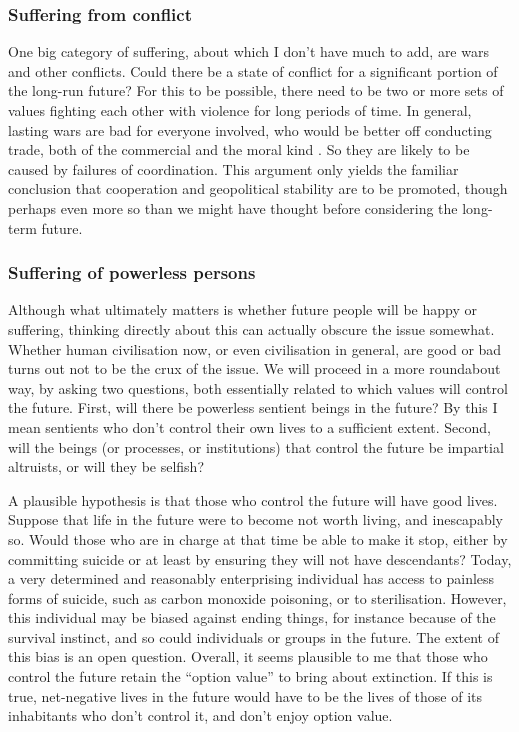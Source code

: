 \documentclass[british]{article}
\begin{document}
\subsubsection{Suffering from conflict}\label{war}
One big category of suffering, about which I don't have much to add, are wars and other conflicts. Could there be a state of conflict for a significant portion of the long-run future? For this to be possible, there need to be two or more sets of values fighting each other with violence for long periods of time. In general, lasting wars are bad for everyone involved, who would be better off conducting trade, both of the commercial and the moral kind \citep{tomasik_gains_2013,ord_moral_2015}. So they are likely to be caused by failures of coordination. This argument only yields the familiar conclusion that cooperation and geopolitical stability are to be promoted, though perhaps even more so than we might have thought before considering the long-term future.

\subsubsection{Suffering of powerless persons}\label{powerless}
Although what ultimately matters is whether future people will be happy or suffering, thinking directly about this can actually obscure the issue somewhat. Whether human civilisation now, or even civilisation in general, are good or bad turns out not to be the crux of the issue. We will proceed in a more roundabout way, by asking two questions, both essentially related to which values will control the future. First, will there be powerless sentient beings in the future? By this I mean sentients who don't control their own lives to a sufficient extent. Second, will the beings (or processes, or institutions) that control the future be impartial altruists, or will they be selfish?

A plausible hypothesis is that those who control the future will have good lives. Suppose that life in the future were to become not worth living, and inescapably so. Would those who are in charge at that time be able to make it stop, either by committing suicide or at least by ensuring they will not have descendants? Today, a very determined and reasonably enterprising individual has access to painless forms of suicide, such as carbon monoxide poisoning, or to sterilisation. However, this individual may be biased against ending things, for instance because of the survival instinct, and so could individuals or groups in the future. The extent of this bias is an open question. Overall, it seems plausible to me that those who control the future retain the ``option value'' to bring about extinction. If this is true, net-negative lives in the future would have to be the lives of those of its inhabitants who don't control it, and don't enjoy option value.
\end{document}
